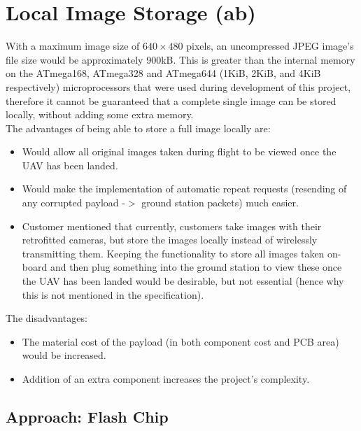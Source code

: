 
\section{Local Image Storage (ab)}
\label{sec:local_storage}

With a maximum image size of $640\times480$ pixels, an uncompressed JPEG 
image's file size would be approximately 900kB.
This is greater than the internal memory on the ATmega168, ATmega328 and 
ATmega644 (1KiB, 2KiB, and 4KiB respectively) microprocessors that were used 
during development of this project, therefore it cannot be guaranteed that a 
complete single image can be stored locally, without adding some extra memory.
\\
The advantages of being able to store a full image locally are:
\begin{itemize}
\item Would allow all original images taken during flight to be viewed once 
the UAV has been landed.
\item Would make the implementation of automatic repeat requests (resending of 
any corrupted payload -$>$ ground station packets) much easier.
\item Customer mentioned that currently, customers take images with their 
retrofitted cameras, but store the images locally instead of wirelessly 
transmitting them. Keeping the functionality to store all images taken 
on-board and then plug something into the ground station to view these once 
the UAV has been landed would be desirable, but not essential (hence why this 
is not mentioned in the specification).
\end{itemize}

The disadvantages:
\begin{itemize}
\item The material cost of the payload (in both component cost and PCB area) 
would be increased.
\item Addition of an extra component increases the project's complexity.
\end{itemize}

\subsection{Approach: Flash Chip}

